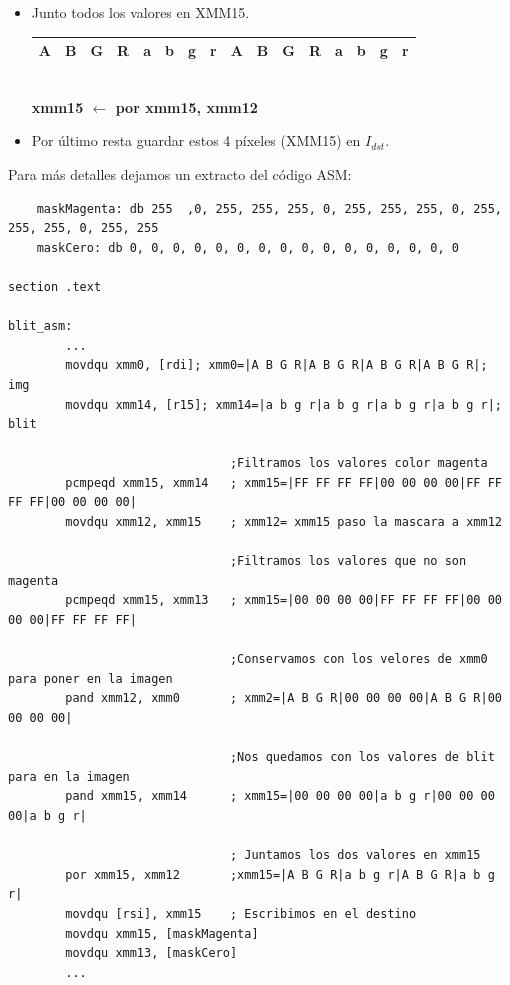 \begin{itemize}
	\item Junto todos los valores en XMM15.
		\begin{center}
		   \begin{tabular}{| c | c | c | c || c | c | c | c || c | c | c | c || c | c | c | c |}
			 \hline
			 A & B & G & R & a & b & g & r & A & B & G & R & a & b & g & r \\ \hline
		   \end{tabular}
		   \\ \textbf{xmm15 $\gets$ por xmm15, xmm12}
		\end{center}		
	\item Por último resta guardar estos 4 píxeles (XMM15) en $I_{dst}$.

\end{itemize}

Para más detalles dejamos un extracto del código ASM:

\begin{codesnippet}
\begin{verbatim}
	maskMagenta: db 255	 ,0, 255, 255, 255, 0, 255, 255, 255, 0, 255, 255, 255, 0, 255, 255
	maskCero: db 0, 0, 0, 0, 0, 0, 0, 0, 0, 0, 0, 0, 0, 0, 0, 0 

section .text

blit_asm:
		...
		movdqu xmm0, [rdi]; xmm0=|A B G R|A B G R|A B G R|A B G R|; img	
		movdqu xmm14, [r15]; xmm14=|a b g r|a b g r|a b g r|a b g r|; blit

							   ;Filtramos los valores color magenta
		pcmpeqd xmm15, xmm14   ; xmm15=|FF FF FF FF|00 00 00 00|FF FF FF FF|00 00 00 00| 
		movdqu xmm12, xmm15	   ; xmm12= xmm15 paso la mascara a xmm12 

							   ;Filtramos los valores que no son magenta
		pcmpeqd xmm15, xmm13   ; xmm15=|00 00 00 00|FF FF FF FF|00 00 00 00|FF FF FF FF|

							   ;Conservamos con los velores de xmm0 para poner en la imagen
		pand xmm12, xmm0       ; xmm2=|A B G R|00 00 00 00|A B G R|00 00 00 00|

							   ;Nos quedamos con los valores de blit para en la imagen
		pand xmm15, xmm14      ; xmm15=|00 00 00 00|a b g r|00 00 00 00|a b g r|
		
							   ; Juntamos los dos valores en xmm15
		por xmm15, xmm12 	   ;xmm15=|A B G R|a b g r|A B G R|a b g r|
		movdqu [rsi], xmm15	   ; Escribimos en el destino
		movdqu xmm15, [maskMagenta]
		movdqu xmm13, [maskCero]
		...
\end{verbatim}
\end{codesnippet}